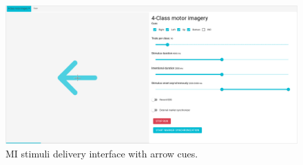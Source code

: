 \begin{figure}[H]
\begin{centering}
% 
\includegraphics[width=1\textwidth]{Appendix/databases/Figures/mi-delivery.png}
\par\end{centering}
\caption{\gls*{MI} stimuli delivery interface with arrow cues.}
\label{}
\end{figure}